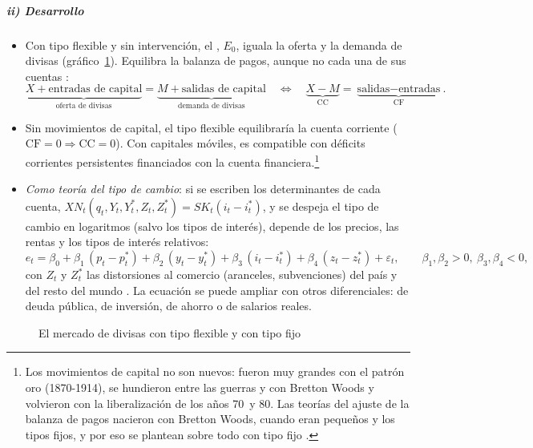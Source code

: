 \documentclass[11pt]{article}
\begin{document}
\subparagraph{ii) Desarrollo}
\begin{itemize}
\item Con tipo flexible y sin intervención, el , $E_0$, iguala la oferta y la demanda de divisas (gráfico~\ref{fig:oferta-demanda-divisas}). Equilibra la balanza de pagos, aunque no cada una de sus cuentas :
  \begin{equation}\label{eq:vaciado}
  \underbrace{X+\text{entradas de capital}}_{\text{oferta de divisas}}=\underbrace{M+\text{salidas de capital}}_{\text{demanda de divisas}}\quad\Longleftrightarrow\quad\underbrace{X-M}_{\mathrm{CC}}=\underbrace{\text{salidas}-\text{entradas}}_{\mathrm{CF}} .
  \end{equation}
\item Sin movimientos de capital, el tipo flexible equilibraría la cuenta corriente ($\mathrm{CF}=0\Rightarrow\mathrm{CC}=0$). Con capitales móviles, es compatible con déficits corrientes persistentes financiados con la cuenta financiera.\footnote{Los movimientos de capital no son nuevos: fueron muy grandes con el patrón oro (1870-1914), se hundieron entre las guerras y con Bretton Woods y volvieron con la liberalización de los años 70~y 80\nocite{ObstfeldTaylor2004Global}. Las teorías del ajuste de la balanza de pagos nacieron con Bretton Woods, cuando eran pequeños y los tipos fijos, y por eso se plantean sobre todo con tipo fijo .}
\item \emph{Como teoría del tipo de cambio}: si se escriben los determinantes de cada cuenta, $XN_t(q_t,Y_t,\allowbreak Y^*_t,Z_t,\allowbreak Z^*_t)=SK_t(i_t-i^*_t)$, y se despeja el tipo de cambio en logaritmos (salvo los tipos de interés), depende de los precios, las rentas y los tipos de interés relativos:
  \begin{equation}\label{eq:flujos-e}
  e_t=\beta_0+\beta_1\,(p_t-p^{*}_t)+\beta_2\,(y_t-y^{*}_t)+\beta_3\,(i_t-i^{*}_t)+\beta_4\,(z_t-z^{*}_t)+\varepsilon_t,\qquad \beta_1,\beta_2>0,\ \beta_3,\beta_4<0,
  \end{equation}
  con $Z_t$ y $Z^*_t$ las distorsiones al comercio (aranceles, subvenciones) del país y del resto del mundo\nocite{Kallianiotis2013Exchange} . La ecuación se puede ampliar con otros diferenciales: de deuda pública, de inversión, de ahorro o de salarios reales.
\end{itemize}

\begin{figure}[H]
\centering
\caption{El mercado de divisas con tipo flexible y con tipo fijo}\label{fig:oferta-demanda-divisas}
\end{figure}
\end{document}
